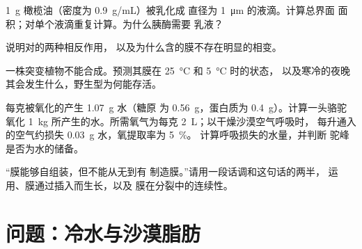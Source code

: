 \begin{exercise}[$\star\star$]\label{exo:b1:lipids:8}
\qty{1}{g} 橄榄油（密度为 \qty{0.9}{g/mL}）被乳化成
直径为 \qty{1}{\micro m} 的液滴。计算总界面
面积；对单个液滴重复计算。为什么胰酶需要
乳液？
\end{exercise}

\begin{exercise}[$\star\star$]\label{exo:b1:lipids:9}
说明对的两种相反作用，
以及为什么含的膜不存在明显的相变。
\end{exercise}

\begin{exercise}[$\star\star\star$]\label{exo:b1:lipids:10}
一株突变植物不能合成。预测其膜在
\qty{25}{\celsius} 和 \qty{5}{\celsius} 时的状态，
以及寒冷的夜晚其会发生什么，野生型为何能存活。
\end{exercise}

\begin{exercise}[$\star\star\star$]\label{exo:b1:lipids:11}
每克被氧化的产生 \qty{1.07}{g} 水（糖原
为 \qty{0.56}{g}，蛋白质为 \qty{0.4}{g}）。计算一头骆驼
氧化 \qty{1}{kg} 所产生的水。所需氧气为每克
\qty{2}{L}；以干燥沙漠空气呼吸时，
每升通入的空气约损失 \qty{0.03}{g} 水，氧提取率为 \qty{5}{\%}。
计算呼吸损失的水量，并判断
驼峰是否为水的储备。
\end{exercise}

\begin{exercise}[$\star\star\star$]\label{exo:b1:lipids:12}
“膜能够自组装，但不能从无到有
制造膜。”请用一段话调和这句话的两半，
运用、膜通过插入而生长，以及
膜在分裂中的连续性。
\end{exercise}

\section{问题：冷水与沙漠脂肪}

